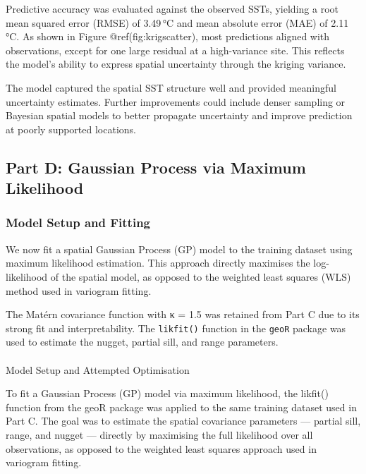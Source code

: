 \documentclass[
  11pt,
]{article}
\makeatletter
\let\oldparagraph\paragraph
\renewcommand{\paragraph}{
    \@ifstar
      \xxxParagraphStar
      \xxxParagraphNoStar
  }
\newcommand{\xxxParagraphStar}[1]{\oldparagraph*{#1}\mbox{}}
\newcommand{\xxxParagraphNoStar}[1]{\oldparagraph{#1}\mbox{}}
\makeatother
\begin{document}
Predictive accuracy was evaluated against the observed SSTs, yielding a
root mean squared error (RMSE) of 3.49\,°C and mean absolute error (MAE)
of 2.11\,°C. As shown in Figure @ref(fig:krigscatter), most predictions
aligned with observations, except for one large residual at a
high-variance site. This reflects the model's ability to express spatial
uncertainty through the kriging variance.

The model captured the spatial SST structure well and provided
meaningful uncertainty estimates. Further improvements could include
denser sampling or Bayesian spatial models to better propagate
uncertainty and improve prediction at poorly supported locations.

\subsection{Part D: Gaussian Process via Maximum
Likelihood}\label{part-d-gaussian-process-via-maximum-likelihood}

\subsubsection{Model Setup and Fitting}\label{model-setup-and-fitting}

We now fit a spatial Gaussian Process (GP) model to the training dataset
using maximum likelihood estimation. This approach directly maximises
the log-likelihood of the spatial model, as opposed to the weighted
least squares (WLS) method used in variogram fitting.

The Matérn covariance function with κ = 1.5 was retained from Part C due
to its strong fit and interpretability. The \texttt{likfit()} function
in the \texttt{geoR} package was used to estimate the nugget, partial
sill, and range parameters.

\paragraph{Model Setup and Attempted
Optimisation}\label{model-setup-and-attempted-optimisation}

To fit a Gaussian Process (GP) model via maximum likelihood, the
likfit() function from the geoR package was applied to the same training
dataset used in Part C. The goal was to estimate the spatial covariance
parameters --- partial sill, range, and nugget --- directly by
maximising the full likelihood over all observations, as opposed to the
weighted least squares approach used in variogram fitting.
\end{document}
